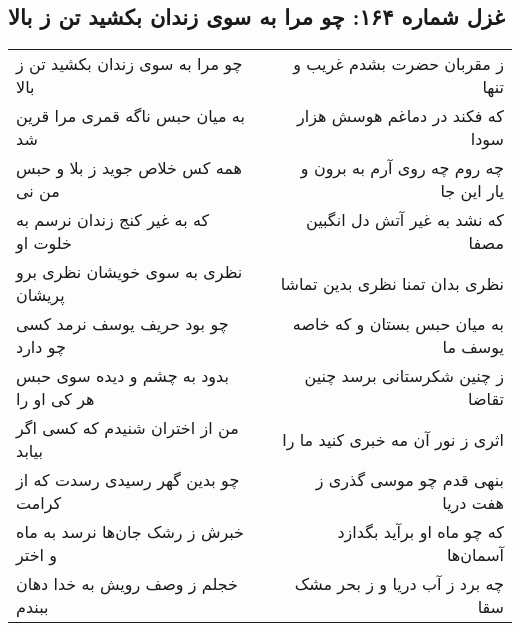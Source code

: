 \begin{center}
\section*{غزل شماره ۱۶۴: چو مرا به سوی زندان بکشید تن ز بالا}
\label{sec:0164}
\begin{longtable}{l p{0.5cm} r}
چو مرا به سوی زندان بکشید تن ز بالا
&&
ز مقربان حضرت بشدم غریب و تنها
\\
به میان حبس ناگه قمری مرا قرین شد
&&
که فکند در دماغم هوسش هزار سودا
\\
همه کس خلاص جوید ز بلا و حبس من نی
&&
چه روم چه روی آرم به برون و یار این جا
\\
که به غیر کنج زندان نرسم به خلوت او
&&
که نشد به غیر آتش دل انگبین مصفا
\\
نظری به سوی خویشان نظری برو پریشان
&&
نظری بدان تمنا نظری بدین تماشا
\\
چو بود حریف یوسف نرمد کسی چو دارد
&&
به میان حبس بستان و که خاصه یوسف ما
\\
بدود به چشم و دیده سوی حبس هر کی او را
&&
ز چنین شکرستانی برسد چنین تقاضا
\\
من از اختران شنیدم که کسی اگر بیابد
&&
اثری ز نور آن مه خبری کنید ما را
\\
چو بدین گهر رسیدی رسدت که از کرامت
&&
بنهی قدم چو موسی گذری ز هفت دریا
\\
خبرش ز رشک جان‌ها نرسد به ماه و اختر
&&
که چو ماه او برآید بگدازد آسمان‌ها
\\
خجلم ز وصف رویش به خدا دهان ببندم
&&
چه برد ز آب دریا و ز بحر مشک سقا
\\
\end{longtable}
\end{center}
